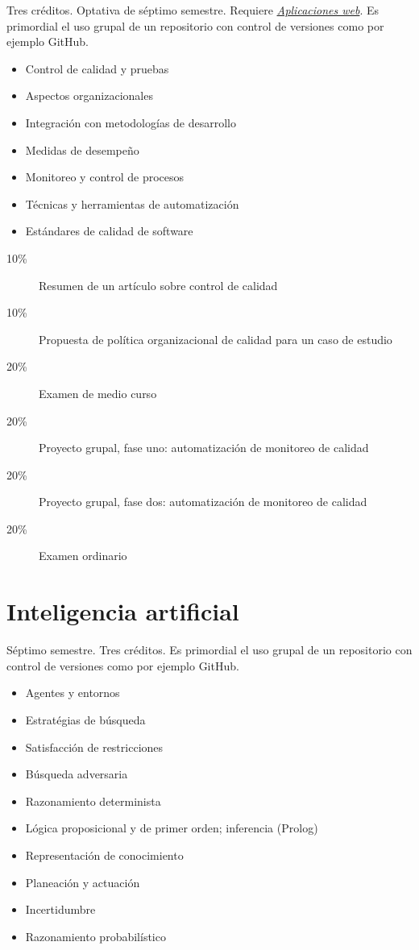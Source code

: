 \documentclass{article}
\begin{document}
\begin{multicols}{4}
Tres cr\'{e}ditos. Optativa de s\'{e}ptimo semestre. Requiere
\hyperlink{aw}{\em Aplicaciones web}. Es primordial el uso grupal
de un repositorio con control de versiones como por ejemplo GitHub.

\begin{itemize}
\item{Control de calidad y pruebas}
\item{Aspectos organizacionales}
\item{Integraci\'{o}n con metodolog\'{i}as de desarrollo}
\item{Medidas de desempe\~{n}o}
\item{Monitoreo y control de procesos}
\item{T\'{e}cnicas y herramientas de automatizaci\'{o}n}
\item{Est\'{a}ndares de calidad de software}
\end{itemize}

\begin{description}
\item[10\%]{Resumen de un art\'{i}culo sobre control de calidad}
\item[10\%]{Propuesta de pol\'{i}tica organizacional de calidad para un
  caso de estudio}
\item[20\%]{Examen de medio curso}  
\item[20\%]{Proyecto grupal, fase uno: automatizaci\'{o}n de monitoreo de calidad}
\item[20\%]{Proyecto grupal, fase dos: automatizaci\'{o}n de monitoreo de calidad}  
\item[20\%]{Examen ordinario}
\end{description}  

\newpage

\hypertarget{ia}{\section*{Inteligencia artificial}}

S\'{e}ptimo semestre. Tres cr\'{e}ditos. Es primordial el uso grupal
de un repositorio con control de versiones como por ejemplo GitHub.

\begin{itemize}
\item{Agentes y entornos}
\item{Estrat\'{e}gias de b\'{u}squeda}
\item{Satisfacci\'{o}n de restricciones}
\item{B\'{u}squeda adversaria}
\item{Razonamiento determinista}
\item{L\'{o}gica proposicional y de primer orden; inferencia (Prolog)}
\item{Representaci\'{o}n de conocimiento}
\item{Planeaci\'{o}n y actuaci\'{o}n}
\item{Incertidumbre}
\item{Razonamiento probabil\'{i}stico}
\end{itemize}


\end{multicols}
\end{document}
